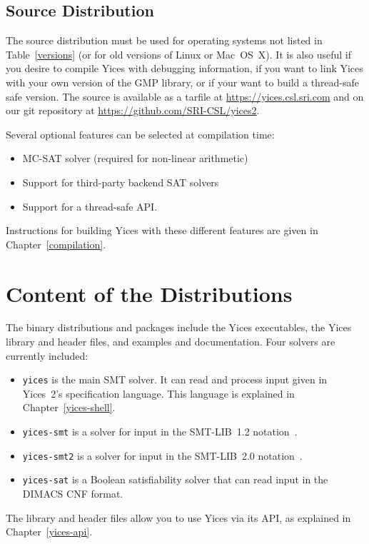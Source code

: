 \documentclass[11pt,twoside,fleqn,openright,titlepage]{cslreport}
\begin{document}
\subsection{Source Distribution}

The source distribution must be used for operating systems not listed
in Table~\ref{versions} (or for old versions of Linux or Mac~OS~X). It
is also useful if you desire to compile Yices with debugging
information, if you want to link Yices with your own version of the
GMP library, or if your want to build a thread-safe safe version.
The source is available as a tarfile at
\url{https://yices.csl.sri.com} and on our git repository at
\url{https://github.com/SRI-CSL/yices2}.

\medskip\noindent
Several optional features can be selected at compilation time:
\begin{itemize}
\item MC-SAT solver (required for non-linear arithmetic)
\item Support for third-party backend SAT solvers
\item Support for a thread-safe API.
\end{itemize}
Instructions for building Yices with these different features are given in Chapter~\ref{compilation}.



\section{Content of the Distributions}

The binary distributions and packages include the Yices executables,
the Yices library and header files, and examples and documentation.
Four solvers are currently included:
\begin{itemize}
\item \texttt{yices} is  the main SMT solver. It  can read and process
  input given  in Yices~2's  specification language. This  language is
  explained in Chapter~\ref{yices-shell}.

\item  \texttt{yices-smt} is  a solver  for input  in  the SMT-LIB~1.2
  notation~\cite{SMTLIB12:2006}.

\item \texttt{yices-smt2} is a solver for input in the SMT-LIB~2.0
  notation~\cite{SMTLIB25:2015}.

\item \texttt{yices-sat}  is a Boolean satisfiability  solver that can
  read input in the DIMACS CNF format.
\end{itemize}
The library and header files allow you to use Yices via its API, as
explained in Chapter~\ref{yices-api}.
\end{document}
